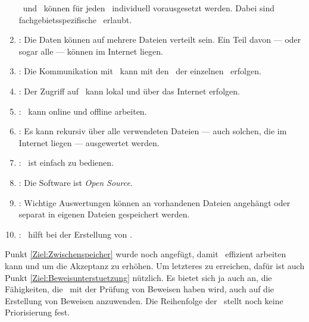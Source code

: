 \begin{enumerate}
	\Axiome\ und \Saetze\ können für jeden \Beweis\ individuell vorausgesetzt werden.
	Dabei sind fachgebietsspezifische \Fachbegriffe\ erlaubt.
	\item \label{Ziel:Internet} :
	Die Daten können auf mehrere Dateien verteilt sein.
	Ein Teil davon --- oder sogar alle --- können im Internet liegen.
	\item \label{Ziel:Kommunikation} :
	Die Kommunikation mit \ASBA\ kann mit den \Fachbegriffen\ der einzelnen \Fachgebiete\ erfolgen.
	\item \label{Ziel:Zugriff} :
	Der Zugriff auf \ASBA\ kann lokal und über das Internet erfolgen.
	\item \label{Ziel:Unabhaengigkeit} :
	\ASBA\ kann online und offline arbeiten.
	\item \label{Ziel:Rekursion} :
	Es kann rekursiv über alle verwendeten Dateien --- auch solchen, die im Internet liegen --- ausgewertet werden.
	\item \label{Ziel:Bedienbarkeit} :
	\ASBA\ ist einfach zu bedienen.
	\item \label{Ziel:Lizenz} :
	Die Software ist \emph{Open Source}.
	\item \label{Ziel:Zwischenspeicher} :
	Wichtige Auswertungen können an vorhandenen Dateien angehängt oder separat in eigenen Dateien gespeichert werden.
	\item \label{Ziel:Beweisunterstuetzung} :
	\ASBA\ hilft bei der Erstellung von \Beweisen.
\end{enumerate}
%
Punkt \ref{Ziel:Zwischenspeicher} wurde noch angefügt, damit \ASBA\ effizient arbeiten kann und um die Akzeptanz zu erhöhen.
Um letzteres zu erreichen, dafür ist auch Punkt \ref{Ziel:Beweisunterstuetzung} nützlich.
Es bietet sich ja auch an, die Fähigkeiten, die \ASBA\ mit der Prüfung von Beweisen haben wird, auch auf die Erstellung von Beweisen anzuwenden.
Die Reihenfolge der \Ziele\ stellt noch keine Priorisierung fest.

